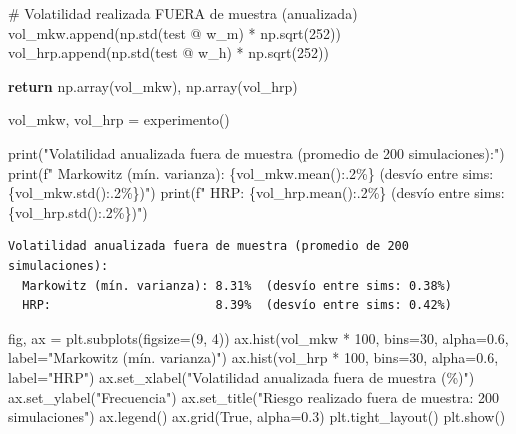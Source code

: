 \documentclass[
  spanish,
  letterpaper,
  DIV=11,
  numbers=noendperiod]{scrreprt}
\newenvironment{Shaded}{\begin{snugshade}}{\end{snugshade}}
\newcommand{\BuiltInTok}[1]{\textcolor[rgb]{0.00,0.23,0.31}{#1}}
\newcommand{\CommentTok}[1]{\textcolor[rgb]{0.37,0.37,0.37}{#1}}
\newcommand{\ControlFlowTok}[1]{\textcolor[rgb]{0.00,0.23,0.31}{\textbf{#1}}}
\newcommand{\DecValTok}[1]{\textcolor[rgb]{0.68,0.00,0.00}{#1}}
\newcommand{\FloatTok}[1]{\textcolor[rgb]{0.68,0.00,0.00}{#1}}
\newcommand{\NormalTok}[1]{\textcolor[rgb]{0.00,0.23,0.31}{#1}}
\newcommand{\OperatorTok}[1]{\textcolor[rgb]{0.37,0.37,0.37}{#1}}
\newcommand{\SpecialCharTok}[1]{\textcolor[rgb]{0.37,0.37,0.37}{#1}}
\newcommand{\SpecialStringTok}[1]{\textcolor[rgb]{0.13,0.47,0.30}{#1}}
\newcommand{\StringTok}[1]{\textcolor[rgb]{0.13,0.47,0.30}{#1}}
\newcommand{\VariableTok}[1]{\textcolor[rgb]{0.07,0.07,0.07}{#1}}
\begin{document}
\begin{Shaded}
\begin{Highlighting}[]
        \CommentTok{\# Volatilidad realizada FUERA de muestra (anualizada)}
\NormalTok{        vol\_mkw.append(np.std(test }\OperatorTok{@}\NormalTok{ w\_m) }\OperatorTok{*}\NormalTok{ np.sqrt(}\DecValTok{252}\NormalTok{))}
\NormalTok{        vol\_hrp.append(np.std(test }\OperatorTok{@}\NormalTok{ w\_h) }\OperatorTok{*}\NormalTok{ np.sqrt(}\DecValTok{252}\NormalTok{))}

    \ControlFlowTok{return}\NormalTok{ np.array(vol\_mkw), np.array(vol\_hrp)}

\NormalTok{vol\_mkw, vol\_hrp }\OperatorTok{=}\NormalTok{ experimento()}

\BuiltInTok{print}\NormalTok{(}\StringTok{"Volatilidad anualizada fuera de muestra (promedio de 200 simulaciones):"}\NormalTok{)}
\BuiltInTok{print}\NormalTok{(}\SpecialStringTok{f"  Markowitz (mín. varianza): }\SpecialCharTok{\{}\NormalTok{vol\_mkw}\SpecialCharTok{.}\NormalTok{mean()}\SpecialCharTok{:.2\%\}}\SpecialStringTok{  (desvío entre sims: }\SpecialCharTok{\{}\NormalTok{vol\_mkw}\SpecialCharTok{.}\NormalTok{std()}\SpecialCharTok{:.2\%\}}\SpecialStringTok{)"}\NormalTok{)}
\BuiltInTok{print}\NormalTok{(}\SpecialStringTok{f"  HRP:                       }\SpecialCharTok{\{}\NormalTok{vol\_hrp}\SpecialCharTok{.}\NormalTok{mean()}\SpecialCharTok{:.2\%\}}\SpecialStringTok{  (desvío entre sims: }\SpecialCharTok{\{}\NormalTok{vol\_hrp}\SpecialCharTok{.}\NormalTok{std()}\SpecialCharTok{:.2\%\}}\SpecialStringTok{)"}\NormalTok{)}
\end{Highlighting}
\end{Shaded}

\begin{verbatim}
Volatilidad anualizada fuera de muestra (promedio de 200 simulaciones):
  Markowitz (mín. varianza): 8.31%  (desvío entre sims: 0.38%)
  HRP:                       8.39%  (desvío entre sims: 0.42%)
\end{verbatim}

\begin{Shaded}
\begin{Highlighting}[]
\NormalTok{fig, ax }\OperatorTok{=}\NormalTok{ plt.subplots(figsize}\OperatorTok{=}\NormalTok{(}\DecValTok{9}\NormalTok{, }\DecValTok{4}\NormalTok{))}
\NormalTok{ax.hist(vol\_mkw }\OperatorTok{*} \DecValTok{100}\NormalTok{, bins}\OperatorTok{=}\DecValTok{30}\NormalTok{, alpha}\OperatorTok{=}\FloatTok{0.6}\NormalTok{, label}\OperatorTok{=}\StringTok{"Markowitz (mín. varianza)"}\NormalTok{)}
\NormalTok{ax.hist(vol\_hrp }\OperatorTok{*} \DecValTok{100}\NormalTok{, bins}\OperatorTok{=}\DecValTok{30}\NormalTok{, alpha}\OperatorTok{=}\FloatTok{0.6}\NormalTok{, label}\OperatorTok{=}\StringTok{"HRP"}\NormalTok{)}
\NormalTok{ax.set\_xlabel(}\StringTok{"Volatilidad anualizada fuera de muestra (\%)"}\NormalTok{)}
\NormalTok{ax.set\_ylabel(}\StringTok{"Frecuencia"}\NormalTok{)}
\NormalTok{ax.set\_title(}\StringTok{"Riesgo realizado fuera de muestra: 200 simulaciones"}\NormalTok{)}
\NormalTok{ax.legend()}
\NormalTok{ax.grid(}\VariableTok{True}\NormalTok{, alpha}\OperatorTok{=}\FloatTok{0.3}\NormalTok{)}
\NormalTok{plt.tight\_layout()}
\NormalTok{plt.show()}
\end{Highlighting}
\end{Shaded}
\end{document}
